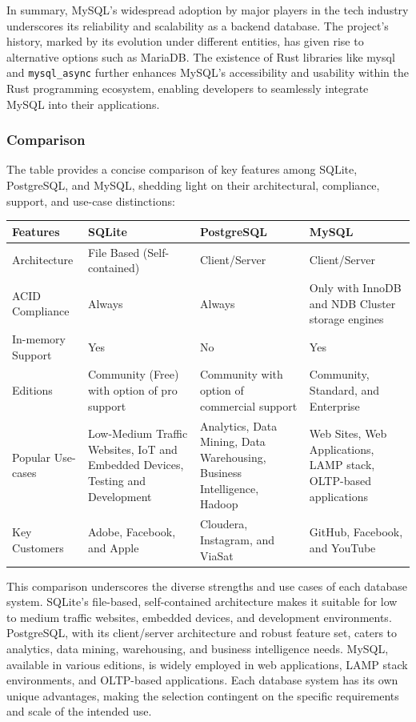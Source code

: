In summary, MySQL's widespread adoption by major players in the tech industry underscores its reliability and scalability as a backend database. The project's 
history, marked by its evolution under different entities, has given rise to alternative options such as MariaDB. The existence of Rust libraries like mysql 
and \verb+mysql_async+ further enhances MySQL's accessibility and usability within the Rust programming ecosystem, enabling developers to seamlessly integrate 
MySQL into their applications.

\subsubsection{Comparison}
The table provides a concise comparison of key features among SQLite, PostgreSQL, and MySQL, shedding light on their architectural, compliance, support, and 
use-case distinctions:

\begin{center}
    \begin{tabular}{ | m{3cm} | m{4cm}| m{4cm} | m{4cm} | } 
      \hline
      Features & SQLite & PostgreSQL & MySQL \\ 
      \hline
      Architecture & File Based (Self-contained) & Client/Server & Client/Server \\ 
      \hline
      ACID Compliance & Always & Always & Only with InnoDB and NDB Cluster storage engines \\ 
      \hline
      In-memory Support & Yes & No & Yes \\
      \hline
      Editions & Community (Free) with option of pro support & Community with option of commercial support & Community, Standard, and Enterprise \\
      \hline
      Popular Use-cases & Low-Medium Traffic Websites, IoT and Embedded Devices, Testing and Development & Analytics, Data Mining, Data Warehousing, Business Intelligence, Hadoop & Web Sites, Web Applications, LAMP stack, OLTP-based applications \\
      \hline
      Key Customers & Adobe, Facebook, and Apple & Cloudera, Instagram, and ViaSat & GitHub, Facebook, and YouTube \\
      \hline
    \end{tabular}
\end{center}

This comparison underscores the diverse strengths and use cases of each database system. SQLite's file-based, self-contained architecture makes it suitable for 
low to medium traffic websites, embedded devices, and development environments. PostgreSQL, with its client/server architecture and robust feature set, caters 
to analytics, data mining, warehousing, and business intelligence needs. MySQL, available in various editions, is widely employed in web applications, LAMP 
stack environments, and OLTP-based applications. Each database system has its own unique advantages, making the selection contingent on the specific 
requirements and scale of the intended use.\newline

